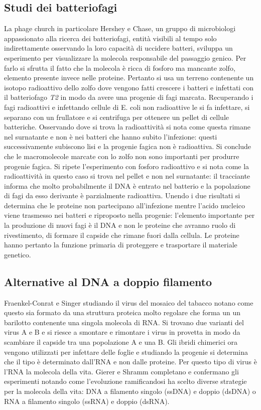 \subsection{Studi dei batteriofagi}
La phage church in particolare Hershey e Chase, un gruppo di microbiologi appassionato alla ricerca dei batteriofagi, entit\`a visibili al tempo solo indirettamente osservando la loro 
capacit\`a di uccidere batteri, sviluppa un esperimento per visualizzare la molecola responsabile del passaggio genico. Per farlo si sfrutta il fatto che la molecola \`e ricca di 
fosforo ma mancante zolfo, elemento presente invece nelle proteine. Pertanto si usa un terreno contenente un isotopo radioattivo dello zolfo dove vengono fatti crescere i batteri e 
infettati con il batteriofago \emph{T2} in modo da avere una progenie di fagi marcata. Recuperando i fagi radioattivi e infettando cellule di E. coli non radioattive le si fa infettare, si 
separano con un frullatore e si centrifuga per ottenere un pellet di cellule batteriche. Osservando dove si trova la radioattivit\`a si nota come questa rimane nel surnatante e non \`e 
nei batteri che hanno subito l'infezione: questi successivamente subiscono lisi e la progenie fagica non \`e radioattiva. Si conclude che le macromolecole marcate con lo zolfo non sono 
importanti per produrre progenie fagica. Si ripete l'esperimento con fosforo radioattivo e si nota come la radioattivit\`a in questo caso si trova nel pellet e non nel surnatante: il 
tracciante informa che molto probabilmente il DNA \`e entrato nel batterio e la popolazione di fagi da esso derivante \`e parzialmente radioattiva. Unendo i due risultati si determina 
che le proteine non partecipano all'infezione mentre l'acido nucleico viene trasmesso nei batteri e riproposto nella progenie: l'elemento importante per la produzione di nuovi fagi \`e 
il DNA e non le proteine che avranno ruolo di rivestimento, di formare il capside che rimane fuori dalla cellula. Le proteine hanno pertanto la funzione primaria di proteggere e 
trasportare il materiale genetico. 
\subsection{Alternative al DNA a doppio filamento}
Fraenkel-Conrat e Singer studiando il virus del mosaico del tabacco notano come questo sia formato da una struttura proteica molto regolare che forma un un barilotto contenente una 
singola molecola di RNA. Si trovano due varianti del virus A e B e si riesce a smontare e rimontare i virus in provetta in modo da scambiare il capside tra una popolazione A e una B. 
Gli ibridi chimerici ora vengono utilizzati per infettare delle foglie e studiando la progenie si determina che il tipo \`e determinato dall'RNA e non dalle proteine. Per questo tipo 
di virus \`e l'RNA la molecola della vita. Gierer e Shramm completano e confermano gli esperimenti notando come l'evoluzione ramificandosi ha scelto diverse strategie per la molecola
della vita: DNA a filamento singolo (ssDNA) e doppio (dsDNA) o RNA a filamento singolo (ssRNA) e doppio (dsRNA). 
